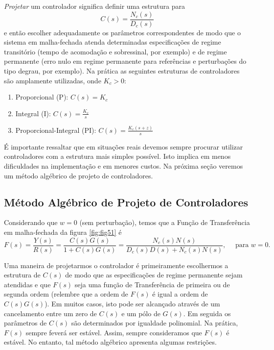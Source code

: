 \documentclass[
]{book}
\providecommand{\tightlist}{%
  \setlength{\itemsep}{0pt}\setlength{\parskip}{0pt}}
\begin{document}
\emph{Projetar} um controlador significa definir uma estrutura para
\[
C(s) = \frac {N_c(s)}{D_c(s)}
\]
e então escolher adequadamente os parâmetros correspondentes de modo que o sistema em malha-fechada atenda determinadas especificações de regime transitório (tempo de acomodação e sobressinal, por exemplo) e de regime permanente (erro nulo em regime permanente para referências e perturbações do tipo degrau, por exemplo). Na prática as seguintes estruturas de controladores são amplamente utilizadas, onde \(K_c>0\):

\begin{enumerate}
\def\labelenumi{\arabic{enumi}.}
\tightlist
\item
  Proporcional (P): \(\boxed{C(s) = K_c}\)
\item
  Integral (I): \(\boxed{C(s) = \frac {K_c}{s}}\)
\item
  Proporcional-Integral (PI): \(\boxed{C(s) = \frac{K_c(s+z)}{s}}\)
\end{enumerate}

É importante ressaltar que em situações reais devemos sempre procurar utilizar controladores com a estrutura mais simples possível. Isto implica em menos dificuldades na implementação e em menores custos. Na próxima seção veremos um método algébrico de projeto de controladores.

\hypertarget{muxe9todo-alguxe9brico-de-projeto-de-controladores}{%
\subsection*{Método Algébrico de Projeto de Controladores}\label{muxe9todo-alguxe9brico-de-projeto-de-controladores}}

Considerando que \(w=0\) (sem perturbação), temos que a Função de Transferência em malha-fechada da figura \ref{fig:fig51} é
\[
F(s) = \frac {Y(s)}{R(s)} = \frac {C(s)G(s)}{1+C(s)G(s)}= \frac {N_c(s)N(s)}{D_c(s)D(s)+N_c(s)N(s)}, \quad \text{ para } w=0.
\]

Uma maneira de projetarmos o controlador é primeiramente escolhermos a estrutura de \(C(s)\) de modo que as especificações de regime permanente sejam atendidas e que \(F(s)\) seja uma função de Transferência de primeira ou de segunda ordem (relembre que a ordem de \(F(s)\) é igual a ordem de \(C(s)G(s)\)). Em muitos casos, isto pode ser alcançado através de um cancelamento entre um zero de \(C(s)\) e um pólo de \(G(s)\). Em seguida os parâmetros de \(C(s)\) são determinados por igualdade polinomial. Na prática, \(F(s)\) sempre feverá ser estável. Assim, sempre consideramos que \(F(s)\) é estável. No entanto, tal método algébrico apresenta algumas restrições.
\end{document}
